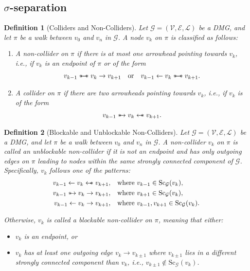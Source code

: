 \documentclass[accepted]{uai2025} %
\newtheorem{definition}{Definition}
\newcommand{\hus}{\mathrel{{\leftarrow\mkern-11mu\ast}}}
\newcommand{\suh}{\mathrel{{\ast\mkern-11mu\to}}}
\newcommand{\sus}{\mathrel{{\ast\mkern-11mu\relbar\mkern-9mu\relbar\mkern-11mu\ast}}}
\begin{document}
\subsection{\texorpdfstring{$\sigma$-separation}{sigma-Separation}}
\begin{definition}[Colliders and Non-Colliders]  
Let \( \mathcal{G} = (\mathcal{V},\mathcal{E},\mathcal{L}) \) be a DMG, and let \( \pi \) be a walk between \( v_0 \) and \( v_n \) in \( \mathcal{G} \). A node \( v_k \) on \( \pi \) is classified as follows:  
\begin{enumerate}  
    \item A \emph{non-collider} on \( \pi \) if there is at most one arrowhead pointing towards \( v_k \), i.e., if \( v_k \) is an endpoint of \( \pi \) or of the form  
    \[
    v_{k-1} \sus  v_k \rightarrow v_{k+1} \quad \text{or} \quad v_{k-1} \leftarrow v_k \sus  v_{k+1}.
    \]
    
    \item A \emph{collider} on \( \pi \) if there are two arrowheads pointing towards \( v_k \), i.e., if \( v_k \) is of the form  
    \[
    v_{k-1} \suh v_k \hus  v_{k+1}.
    \]
\end{enumerate}  
\end{definition}

\begin{definition}[Blockable and Unblockable Non-Colliders]  
Let \( \mathcal{G} = (\mathcal{V},\mathcal{E},\mathcal{L}) \) be a DMG, and let \( \pi \) be a walk between \( v_0 \) and \( v_n \) in \( \mathcal{G} \). A non-collider \( v_k \) on \( \pi \) is called an \emph{unblockable non-collider} if it is not an endpoint and has only outgoing edges on \( \pi \) leading to nodes within the same strongly connected component of \( \mathcal{G} \). Specifically, \( v_k \) follows one of the patterns:
\begin{align*}  
    v_{k-1} \leftarrow v_k \hus  v_{k+1}, & \quad \text{where } v_{k-1} \in \text{Sc}_\mathcal{G}(v_k), \\  
    v_{k-1} \suh v_k \rightarrow v_{k+1}, & \quad \text{where } v_{k+1} \in \text{Sc}_\mathcal{G}(v_k), \\  
    v_{k-1} \leftarrow v_k \rightarrow v_{k+1}, & \quad \text{where } v_{k-1}, v_{k+1} \in \text{Sc}_\mathcal{G}(v_k).
\end{align*}  

Otherwise, \( v_k \) is called a \emph{blockable non-collider} on \( \pi \), meaning that either:
\begin{itemize}  
    \item \( v_k \) is an endpoint, or  
    \item \( v_k \) has at least one outgoing edge \( v_k \rightarrow v_{k\pm1} \) where \( v_{k\pm1} \) lies in a different strongly connected component than \( v_k \), i.e., \( v_{k\pm1} \notin \text{Sc}_\mathcal{G}(v_k) \).
\end{itemize}  
\end{definition}
\end{document}
